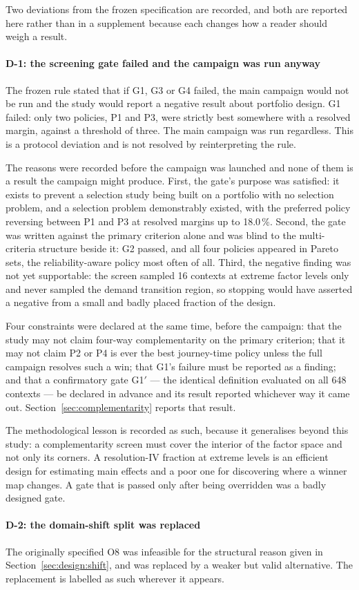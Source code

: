 Two deviations from the frozen specification are recorded, and both are reported
here rather than in a supplement because each changes how a reader should weigh
a result.

\paragraph{D-1: the screening gate failed and the campaign was run anyway}
The frozen rule stated that if G1, G3 or G4 failed, the main campaign would not
be run and the study would report a negative result about portfolio design. G1
failed: only two policies, P1 and P3, were strictly best somewhere with a
resolved margin, against a threshold of three. The main campaign was run
regardless. This is a protocol deviation and is not resolved by reinterpreting
the rule.

The reasons were recorded before the campaign was launched and none of them is a
result the campaign might produce. First, the gate's purpose was satisfied: it
exists to prevent a selection study being built on a portfolio with no selection
problem, and a selection problem demonstrably existed, with the preferred policy
reversing between P1 and P3 at resolved margins up to 18.0\,\%. Second, the gate
was written against the primary criterion alone and was blind to the
multi-criteria structure beside it: G2 passed, and all four policies appeared in
Pareto sets, the reliability-aware policy most often of all. Third, the negative
finding was not yet supportable: the screen sampled 16 contexts at extreme factor
levels only and never sampled the demand transition region, so stopping would
have asserted a negative from a small and badly placed fraction of the design.

Four constraints were declared at the same time, before the campaign: that the
study may not claim four-way complementarity on the primary criterion; that it
may not claim P2 or P4 is ever the best journey-time policy unless the full
campaign resolves such a win; that G1's failure must be reported as a finding;
and that a confirmatory gate G1$'$ --- the identical definition evaluated on all
648 contexts --- be declared in advance and its result reported whichever way it
came out. Section~\ref{sec:complementarity} reports that result.

The methodological lesson is recorded as such, because it generalises beyond this
study: a complementarity screen must cover the interior of the factor space and
not only its corners. A resolution-IV fraction at extreme levels is an efficient
design for estimating main effects and a poor one for discovering where a winner
map changes. A gate that is passed only after being overridden was a badly
designed gate.

\paragraph{D-2: the domain-shift split was replaced}
The originally specified O8 was infeasible for the structural reason given in
Section~\ref{sec:design:shift}, and was replaced by a weaker but valid
alternative. The replacement is labelled as such wherever it appears.
